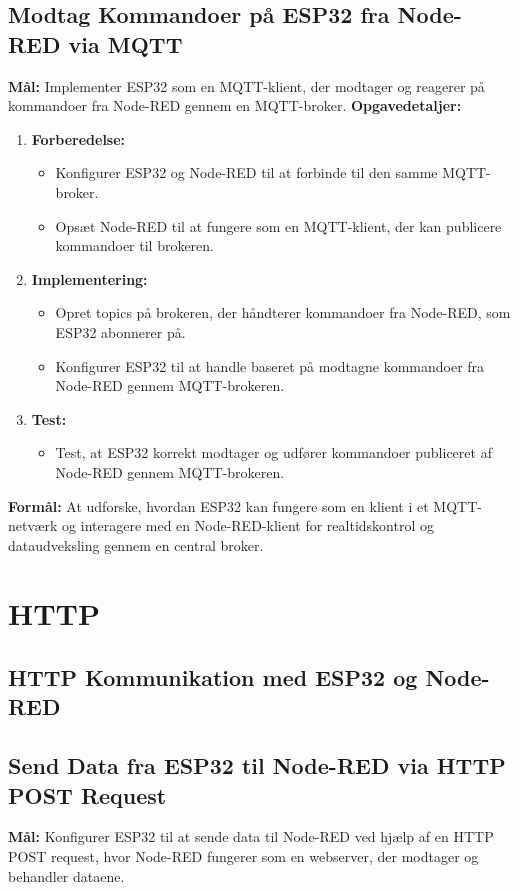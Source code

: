 \documentclass[12pt,a4paper]{book}
\begin{document}
	\subsection*{Modtag Kommandoer på ESP32 fra Node-RED via MQTT}
	\textbf{Mål:} Implementer ESP32 som en MQTT-klient, der modtager og reagerer på kommandoer fra Node-RED gennem en MQTT-broker.
	\newline\newline\noindent
	\textbf{Opgavedetaljer:}
	\begin{enumerate}
		\item \textbf{Forberedelse:}
		\begin{itemize}
			\item Konfigurer ESP32 og Node-RED til at forbinde til den samme MQTT-broker.
			\item Opsæt Node-RED til at fungere som en MQTT-klient, der kan publicere kommandoer til brokeren.
		\end{itemize}
		\item \textbf{Implementering:}
		\begin{itemize}
			\item Opret topics på brokeren, der håndterer kommandoer fra Node-RED, som ESP32 abonnerer på.
			\item Konfigurer ESP32 til at handle baseret på modtagne kommandoer fra Node-RED gennem MQTT-brokeren.
		\end{itemize}
		\item \textbf{Test:}
		\begin{itemize}
			\item Test, at ESP32 korrekt modtager og udfører kommandoer publiceret af Node-RED gennem MQTT-brokeren.
		\end{itemize}
	\end{enumerate}
	\textbf{Formål:} At udforske, hvordan ESP32 kan fungere som en klient i et MQTT-netværk og interagere med en Node-RED-klient for realtidskontrol og dataudveksling gennem en central broker.
	
	\section{HTTP}
	\subsection*{HTTP Kommunikation med ESP32 og Node-RED}
	\subsection*{Send Data fra ESP32 til Node-RED via HTTP POST Request}
	\textbf{Mål:} Konfigurer ESP32 til at sende data til Node-RED ved hjælp af en HTTP POST request, hvor Node-RED fungerer som en webserver, der modtager og behandler dataene.
	
\end{document}
